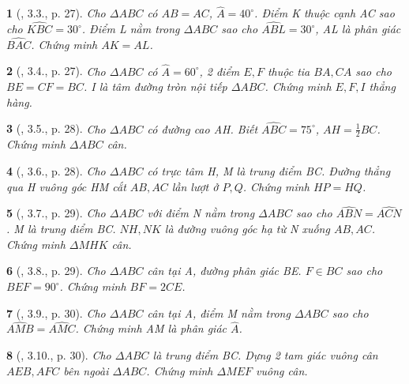 \documentclass{article}
\newtheorem{baitoan}{}
\begin{document}
\begin{baitoan}[\cite{Hung_Mai_Toan_7_hinh_hoc}, 3.3., p. 27]
	Cho $\Delta ABC$ có $AB = AC$, $\widehat{A} = 40^\circ$. Điểm K thuộc cạnh AC sao cho $\widehat{KBC} = 30^\circ$. Điểm L nằm trong $\Delta ABC$ sao cho $\widehat{ABL} = 30^\circ$, AL là phân giác $\widehat{BAC}$. Chứng minh $AK = AL$.
\end{baitoan}

\begin{baitoan}[\cite{Hung_Mai_Toan_7_hinh_hoc}, 3.4., p. 27]
	Cho $\Delta ABC$ có $\widehat{A} = 60^\circ$, 2 điểm $E,F$ thuộc tia $BA,CA$ sao cho $BE = CF = BC$. I là tâm đường tròn nội tiếp $\Delta ABC$. Chứng minh $E,F,I$ thẳng hàng.
\end{baitoan}

\begin{baitoan}[\cite{Hung_Mai_Toan_7_hinh_hoc}, 3.5., p. 28]
	Cho $\Delta ABC$ có đường cao AH. Biết $\widehat{ABC} = 75^\circ$, $AH = \frac{1}{2}BC$. Chứng minh $\Delta ABC$ cân.
\end{baitoan}

\begin{baitoan}[\cite{Hung_Mai_Toan_7_hinh_hoc}, 3.6., p. 28]
	Cho $\Delta ABC$ có trực tâm H, M là trung điểm BC. Đường thẳng qua H vuông góc HM cắt $AB,AC$ lần lượt ở $P,Q$. Chứng minh $HP = HQ$.
\end{baitoan}

\begin{baitoan}[\cite{Hung_Mai_Toan_7_hinh_hoc}, 3.7., p. 29]
	Cho $\Delta ABC$ với điểm N nằm trong $\Delta ABC$ sao cho $\widehat{ABN} = \widehat{ACN}$. M là trung điểm BC. $NH,NK$ là đường vuông góc hạ từ N xuống $AB,AC$. Chứng minh $\Delta MHK$ cân.
\end{baitoan}

\begin{baitoan}[\cite{Hung_Mai_Toan_7_hinh_hoc}, 3.8., p. 29]
	Cho $\Delta ABC$ cân tại A, đường phân giác BE. $F\in BC$ sao cho $\widehat{BEF} = 90^\circ$. Chứng minh $BF = 2CE$.
\end{baitoan}

\begin{baitoan}[\cite{Hung_Mai_Toan_7_hinh_hoc}, 3.9., p. 30]
	Cho $\Delta ABC$ cân tại A, điểm M nằm trong $\Delta ABC$ sao cho $\widehat{AMB} = \widehat{AMC}$. Chứng minh AM là phân giác $\widehat{A}$.
\end{baitoan}

\begin{baitoan}[\cite{Hung_Mai_Toan_7_hinh_hoc}, 3.10., p. 30]
	Cho $\Delta ABC$ là trung điểm BC. Dựng 2 tam giác vuông cân $AEB,AFC$ bên ngoài $\Delta ABC$. Chứng minh $\Delta MEF$ vuông cân.
\end{baitoan}
\end{document}
